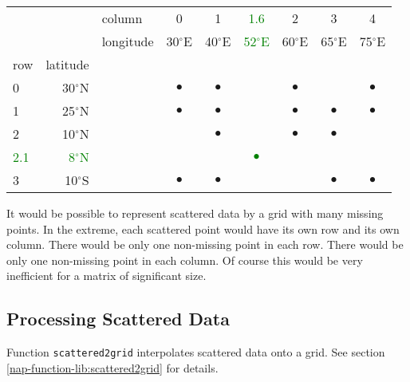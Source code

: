     \begin{tabular}{|lrl|cccccc|}
      \hline 
         & 
         & 
        column & 
        0 & 
        1 & 
	\textcolor{green}{1.6}
         & 
        2 & 
        3 & 
        4
      \\
         & 
         & 
        longitude & 
        30$^{\circ}$E & 
        40$^{\circ}$E & 
	\textcolor{green}{52$^{\circ}$E}
         & 
        60$^{\circ}$E & 
        65$^{\circ}$E & 
        75$^{\circ}$E
      \\
        row & 
        latitude
         & 
         & 
         & 
         & 
         & 
         & 
         & 
      \\
      \hline 
        0 & 
        30$^{\circ}$N & 
         & 
        $\bullet$ & 
        $\bullet$ & 
         & 
        $\bullet$ & 
	& 
        $\bullet$
      \\
        1 & 
        25$^{\circ}$N & 
         & 
        $\bullet$ & 
        $\bullet$ & 
         & 
        $\bullet$ & 
        $\bullet$ & 
        $\bullet$ 
      \\
        2 & 
        10$^{\circ}$N & 
         & 
         & 
        $\bullet$ & 
         & 
        $\bullet$ & 
        $\bullet$ & 
      \\
	\textcolor{green}{2.1}
         & 
	\textcolor{green}{8$^{\circ}$N}
         & 
         & 
         & 
         & 
\textcolor{green}{$\bullet$}
         & 
         & 
         & 
      \\
        3 & 
        10$^{\circ}$S & 
         & 
        $\bullet$ & 
        $\bullet$ & 
         & 
         & 
        $\bullet$ & 
        $\bullet$
      \\
      \hline 
\end{tabular}

  \par It would be possible to represent scattered data by a grid with
  many missing points. In the extreme, each scattered point would have
  its own row and its own column. There would be only one non-missing
  point in each row. There would be only one non-missing point in each
  column. Of course this would be very inefficient for a matrix of
  significant size.
  \subsection{
    \label{Scattered}Processing Scattered Data
  }

  \par Function 
{\texttt{scattered2grid} } interpolates scattered data onto a grid.
See section
  \ref{nap-function-lib:scattered2grid}
for details.
